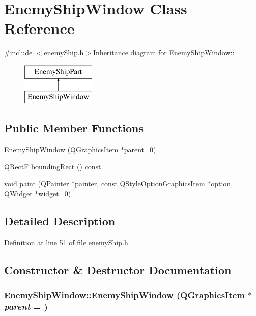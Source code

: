 \hypertarget{class_enemy_ship_window}{
\section{EnemyShipWindow Class Reference}
\label{class_enemy_ship_window}
}


{\ttfamily \#include $<$enemyShip.h$>$}Inheritance diagram for EnemyShipWindow::\begin{figure}[H]
\begin{center}
\leavevmode
\includegraphics[height=2cm]{class_enemy_ship_window}
\end{center}
\end{figure}
\subsection*{Public Member Functions}
\begin{DoxyCompactItemize}
\item 
\hyperlink{class_enemy_ship_window_a0e82d166172aa24bd38937f023782c11}{EnemyShipWindow} (QGraphicsItem $\ast$parent=0)
\item 
QRectF \hyperlink{class_enemy_ship_window_abd9ffd83f2140b9c1aee4cfa91d49045}{boundingRect} () const 
\item 
void \hyperlink{class_enemy_ship_window_a3a95734ffb128eb9a8ef7b7913755453}{paint} (QPainter $\ast$painter, const QStyleOptionGraphicsItem $\ast$option, QWidget $\ast$widget=0)
\end{DoxyCompactItemize}


\subsection{Detailed Description}


Definition at line 51 of file enemyShip.h.

\subsection{Constructor \& Destructor Documentation}
\hypertarget{class_enemy_ship_window_a0e82d166172aa24bd38937f023782c11}{
\subsubsection[{EnemyShipWindow}]{\setlength{\rightskip}{0pt plus 5cm}EnemyShipWindow::EnemyShipWindow (QGraphicsItem $\ast$ {\em parent} = {})}}
\label{class_enemy_ship_window_a0e82d166172aa24bd38937f023782c11}


